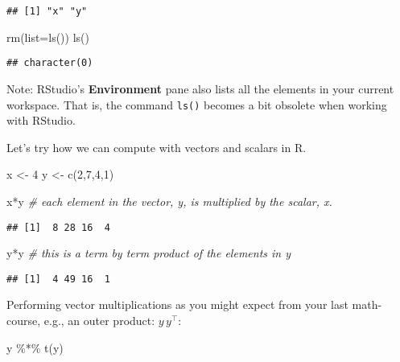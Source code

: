 \documentclass[
]{book}
\newenvironment{Shaded}{\begin{snugshade}}{\end{snugshade}}
\newcommand{\AttributeTok}[1]{\textcolor[rgb]{0.77,0.63,0.00}{#1}}
\newcommand{\CommentTok}[1]{\textcolor[rgb]{0.56,0.35,0.01}{\textit{#1}}}
\newcommand{\DecValTok}[1]{\textcolor[rgb]{0.00,0.00,0.81}{#1}}
\newcommand{\FunctionTok}[1]{\textcolor[rgb]{0.00,0.00,0.00}{#1}}
\newcommand{\NormalTok}[1]{#1}
\newcommand{\OtherTok}[1]{\textcolor[rgb]{0.56,0.35,0.01}{#1}}
\newcommand{\SpecialCharTok}[1]{\textcolor[rgb]{0.00,0.00,0.00}{#1}}
\begin{document}
\begin{verbatim}
## [1] "x" "y"
\end{verbatim}

\begin{Shaded}
\begin{Highlighting}[]
\FunctionTok{rm}\NormalTok{(}\AttributeTok{list=}\FunctionTok{ls}\NormalTok{())}
\FunctionTok{ls}\NormalTok{()}
\end{Highlighting}
\end{Shaded}

\begin{verbatim}
## character(0)
\end{verbatim}

Note: RStudio's \textbf{Environment} pane also lists all the elements in your current workspace. That is, the command \texttt{ls()} becomes a bit obsolete when working with RStudio.

Let's try how we can compute with vectors and scalars in R.

\begin{Shaded}
\begin{Highlighting}[]
\NormalTok{x }\OtherTok{\textless{}{-}} \DecValTok{4}
\NormalTok{y }\OtherTok{\textless{}{-}} \FunctionTok{c}\NormalTok{(}\DecValTok{2}\NormalTok{,}\DecValTok{7}\NormalTok{,}\DecValTok{4}\NormalTok{,}\DecValTok{1}\NormalTok{)}

\NormalTok{x}\SpecialCharTok{*}\NormalTok{y }\CommentTok{\# each element in the vector, y, is multiplied by the scalar, x.}
\end{Highlighting}
\end{Shaded}

\begin{verbatim}
## [1]  8 28 16  4
\end{verbatim}

\begin{Shaded}
\begin{Highlighting}[]
\NormalTok{y}\SpecialCharTok{*}\NormalTok{y }\CommentTok{\# this is a term by term product of the elements in y}
\end{Highlighting}
\end{Shaded}

\begin{verbatim}
## [1]  4 49 16  1
\end{verbatim}

Performing vector multiplications as you might expect from your last math-course, e.g., an outer product: \(y\,y^\top\):

\begin{Shaded}
\begin{Highlighting}[]
\NormalTok{y }\SpecialCharTok{\%*\%} \FunctionTok{t}\NormalTok{(y)}
\end{Highlighting}
\end{Shaded}
\end{document}
